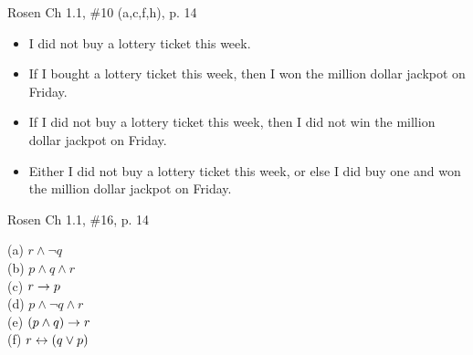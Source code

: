 \begin{questions}
  Rosen Ch 1.1, \#10 (a,c,f,h), p. 14 
    \ifprintanswers
        \vspace{-10pt}
    \fi
    \begin{solution}
        \begin{itemize}[itemsep=0pt,parsep=0pt,
        topsep=0pt,partopsep=0pt]
            \item[(a)] I did not buy a lottery ticket this week.
            \item[(c)] If I bought a lottery ticket this week, then I won the million dollar jackpot on Friday. 
            \item[(f)] If I did not buy a lottery ticket this week, then I did not win the million dollar jackpot on Friday. 
            \item[(h)] Either I did not buy a lottery ticket this week, or else I did buy one and won the million dollar jackpot on Friday.
        \end{itemize}
    \end{solution}




  Rosen Ch 1.1, \#16, p. 14
    \ifprintanswers
        \vspace{-5pt}
    \fi
    \begin{solution}
        (a) $r \wedge \neg q$ \\
        (b) $p \wedge q \wedge r$ \\
        (c) $r \rightarrow p$ \\
        (d) $p \wedge \neg q \wedge r$ \\ 
        (e) $(p \wedge q) \rightarrow r$ \\
        (f) $r \leftrightarrow (q \vee p)$
    \end{solution}





\end{questions}
